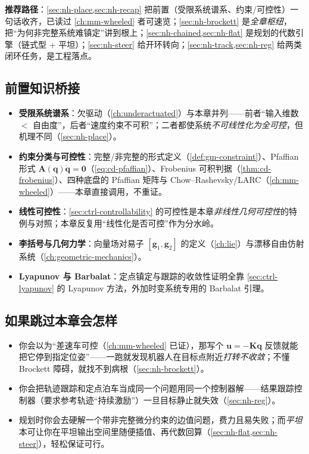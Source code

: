 \noindent\textbf{推荐路径}：\cref{sec:nh-place,sec:nh-recap} 把前置（受限系统谱系、约束/可控性）一句话收齐，已读过 \cref{ch:mm-wheeled} 者可速览；\cref{sec:nh-brockett} 是\emph{全章枢纽}，把“为何非完整系统难镇定”讲到根上；\cref{sec:nh-chained,sec:nh-flat} 是规划的代数引擎（链式型 + 平坦）；\cref{sec:nh-steer} 给开环转向；\cref{sec:nh-track,sec:nh-reg} 给两类闭环任务，是工程落点。

\subsection*{前置知识桥接}
\begin{itemize}
  \item \textbf{受限系统谱系}：欠驱动（\cref{ch:underactuated}）与本章并列——前者“输入维数 $<$ 自由度”，后者“速度约束不可积”；二者都使系统\emph{不可线性化为全可控}，但机理不同（\cref{sec:nh-place}）。
  \item \textbf{约束分类与可控性}：完整/非完整的形式定义（\cref{def:gm-constraint}）、Pfaffian 形式 $\mathbf{A}(\mathbf{q})\dot{\mathbf{q}}=\mathbf{0}$（\cref{eq:cd-pfaffian}）、Frobenius 可积判据（\cref{thm:cd-frobenius}）、四种底盘的 Pfaffian 矩阵与 Chow--Rashevsky/LARC（\cref{ch:mm-wheeled}）——本章直接调用，不重证。
  \item \textbf{线性可控性}：\cref{sec:ctrl-controllability} 的可控性是本章\emph{非线性几何可控性}的特例与对照；本章反复用“线性化是否可控”作为分水岭。
  \item \textbf{李括号与几何力学}：向量场对易子 $[\mathbf{g}_1,\mathbf{g}_2]$ 的定义（\cref{ch:lie}）与漂移自由仿射系统（\cref{ch:geometric-mechanics}）。
  \item \textbf{Lyapunov 与 Barbalat}：定点镇定与跟踪的收敛性证明全靠 \cref{sec:ctrl-lyapunov} 的 Lyapunov 方法，外加时变系统专用的 Barbalat 引理。
\end{itemize}

\subsection*{如果跳过本章会怎样}
\begin{itemize}
  \item 你会以为“差速车可控（\cref{ch:mm-wheeled} 已证），那写个 $\mathbf{u}=-\mathbf{K}\mathbf{q}$ 反馈就能把它停到指定位姿”——一跑就发现机器人在目标点附近\emph{打转不收敛}；不懂 Brockett 障碍，就找不到病根（\cref{sec:nh-brockett}）。
  \item 你会把轨迹跟踪和定点泊车当成同一个问题用同一个控制器解——结果跟踪控制器（要求参考轨迹“持续激励”）一旦目标静止就失效（\cref{sec:nh-reg}）。
  \item 规划时你会去硬解一个带非完整微分约束的边值问题，费力且易失败；而\emph{平坦}本可让你在平坦输出空间里随便插值、再代数回算（\cref{sec:nh-flat,sec:nh-steer}），轻松保证可行。
\end{itemize}

